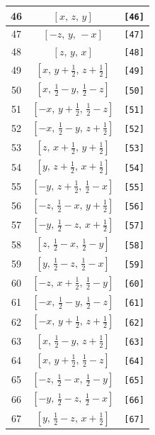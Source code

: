 \documentclass[fleqn,8pt]{jsarticle}
\begin{document}
\begin{longtable}{ccc}
46 & $\left[ x,\, z,\, y \right]$ & {\tt [46]} \\ \hline
47 & $\left[ - z,\, y,\, - x \right]$ & {\tt [47]} \\ \hline
48 & $\left[ z,\, y,\, x \right]$ & {\tt [48]} \\ \hline
49 & $\left[ x,\, y + \frac{1}{2},\, z + \frac{1}{2} \right]$ & {\tt [49]} \\ \hline
50 & $\left[ x,\, \frac{1}{2} - y,\, \frac{1}{2} - z \right]$ & {\tt [50]} \\ \hline
51 & $\left[ - x,\, y + \frac{1}{2},\, \frac{1}{2} - z \right]$ & {\tt [51]} \\ \hline
52 & $\left[ - x,\, \frac{1}{2} - y,\, z + \frac{1}{2} \right]$ & {\tt [52]} \\ \hline
53 & $\left[ z,\, x + \frac{1}{2},\, y + \frac{1}{2} \right]$ & {\tt [53]} \\ \hline
54 & $\left[ y,\, z + \frac{1}{2},\, x + \frac{1}{2} \right]$ & {\tt [54]} \\ \hline
55 & $\left[ - y,\, z + \frac{1}{2},\, \frac{1}{2} - x \right]$ & {\tt [55]} \\ \hline
56 & $\left[ - z,\, \frac{1}{2} - x,\, y + \frac{1}{2} \right]$ & {\tt [56]} \\ \hline
57 & $\left[ - y,\, \frac{1}{2} - z,\, x + \frac{1}{2} \right]$ & {\tt [57]} \\ \hline
58 & $\left[ z,\, \frac{1}{2} - x,\, \frac{1}{2} - y \right]$ & {\tt [58]} \\ \hline
59 & $\left[ y,\, \frac{1}{2} - z,\, \frac{1}{2} - x \right]$ & {\tt [59]} \\ \hline
60 & $\left[ - z,\, x + \frac{1}{2},\, \frac{1}{2} - y \right]$ & {\tt [60]} \\ \hline
61 & $\left[ - x,\, \frac{1}{2} - y,\, \frac{1}{2} - z \right]$ & {\tt [61]} \\ \hline
62 & $\left[ - x,\, y + \frac{1}{2},\, z + \frac{1}{2} \right]$ & {\tt [62]} \\ \hline
63 & $\left[ x,\, \frac{1}{2} - y,\, z + \frac{1}{2} \right]$ & {\tt [63]} \\ \hline
64 & $\left[ x,\, y + \frac{1}{2},\, \frac{1}{2} - z \right]$ & {\tt [64]} \\ \hline
65 & $\left[ - z,\, \frac{1}{2} - x,\, \frac{1}{2} - y \right]$ & {\tt [65]} \\ \hline
66 & $\left[ - y,\, \frac{1}{2} - z,\, \frac{1}{2} - x \right]$ & {\tt [66]} \\ \hline
67 & $\left[ y,\, \frac{1}{2} - z,\, x + \frac{1}{2} \right]$ & {\tt [67]} \\ \hline

\end{longtable}
\end{document}
